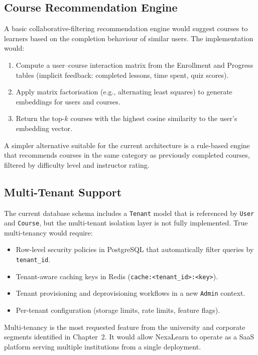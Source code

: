 \subsection{Course Recommendation Engine}

A basic collaborative-filtering recommendation engine would suggest courses to learners based on the completion behaviour of similar users. The implementation would:

\begin{enumerate}
  \item Compute a user--course interaction matrix from the Enrollment and Progress tables (implicit feedback: completed lessons, time spent, quiz scores).
  \item Apply matrix factorisation (e.g., alternating least squares) to generate embeddings for users and courses.
  \item Return the top-$k$ courses with the highest cosine similarity to the user's embedding vector.
\end{enumerate}

A simpler alternative suitable for the current architecture is a rule-based engine that recommends courses in the same category as previously completed courses, filtered by difficulty level and instructor rating.

\subsection{Multi-Tenant Support}

The current database schema includes a \texttt{Tenant} model that is referenced by \texttt{User} and \texttt{Course}, but the multi-tenant isolation layer is not fully implemented. True multi-tenancy would require:

\begin{itemize}
  \item Row-level security policies in PostgreSQL that automatically filter queries by \texttt{tenant\_id}.
  \item Tenant-aware caching keys in Redis (\texttt{cache:<tenant\_id>:<key>}).
  \item Tenant provisioning and deprovisioning workflows in a new \texttt{Admin} context.
  \item Per-tenant configuration (storage limits, rate limits, feature flags).
\end{itemize}

Multi-tenancy is the most requested feature from the university and corporate segments identified in Chapter~2. It would allow NexaLearn to operate as a SaaS platform serving multiple institutions from a single deployment.

